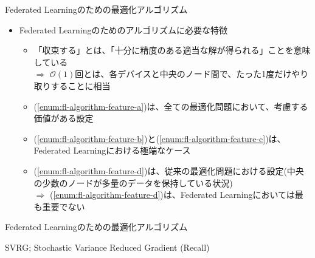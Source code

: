 \documentclass[dvipdfmx,notheorems,t]{beamer}
\begin{document}
\begin{frame}{Federated Learningのための最適化アルゴリズム}

\begin{itemize}
	\item Federated Learningのためのアルゴリズムに必要な特徴
	\begin{itemize}
		\item 「収束する」とは、「十分に精度のある適当な解が得られる」ことを意味している \\
		$\Rightarrow$ $\mathcal{O}(1)$回とは、各デバイスと中央のノード間で、\alert{たった1度だけ}やり取りすることに相当
		\newline
		
		\item (\ref{enum:fl-algorithm-feature-a})は、全ての最適化問題において、考慮する価値がある設定
		\item (\ref{enum:fl-algorithm-feature-b})と(\ref{enum:fl-algorithm-feature-c})は、Federated Learningにおける極端なケース
		\item (\ref{enum:fl-algorithm-feature-d})は、従来の最適化問題における設定(中央の少数のノードが多量のデータを保持している状況) \\
		$\Rightarrow$ (\ref{enum:fl-algorithm-feature-d})は、Federated Learningにおいては最も重要でない
	\end{itemize}
\end{itemize}

\end{frame}

\begin{frame}{Federated Learningのための最適化アルゴリズム}

\begin{algorithm}[H]
	\DontPrintSemicolon
	\caption{SVRG; Stochastic Variance Reduced Gradient (Recall) ~\cite{stochastic_2017}}
	\label{alg:svrg-recall}
	\begin{algorithmic}[1]
			 
				 
			\ENDFOR
		\ENDFOR
	\end{algorithmic}
\end{algorithm}

\end{frame}
\end{document}
